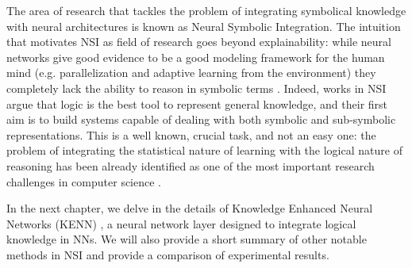 The area of research that tackles the problem of integrating symbolical knowledge with neural architectures is known as Neural Symbolic Integration. The intuition that motivates NSI as field of research goes beyond explainability: while neural networks give good evidence to be a good modeling framework for the human mind (e.g. parallelization and adaptive learning from the environment) they completely lack the ability to reason in symbolic terms \cite{Besold2017NeuralSymbolicLA}. Indeed, works in NSI argue that logic is the best tool to represent general knowledge, and their first aim is to build systems capable of dealing with both symbolic and sub-symbolic representations.
This is a well known, crucial task, and not an easy one: the problem of integrating the statistical nature of learning with the logical nature of reasoning has been already identified as one of the most important research challenges in computer science \cite{valiant2003threeproblems}.

In the next chapter, we delve in the details of Knowledge Enhanced Neural Networks (KENN) \cite{daniele2019kenn}, a neural network layer designed to integrate logical knowledge in NNs. We will also provide a short summary of other notable methods in NSI and provide a comparison of experimental results.




